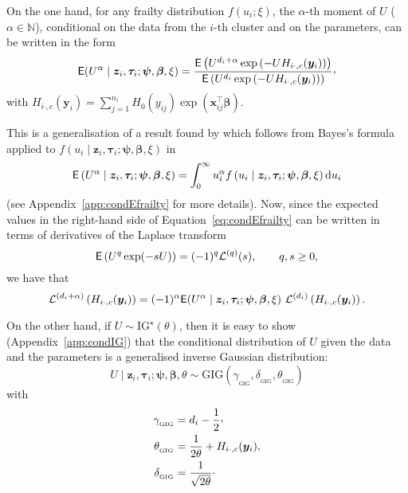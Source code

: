On the one hand, for any frailty distribution $f ( u_{i} ; \xi )$, 
  the $\alpha$-th moment of $U$ ($\alpha \in \mathbb N$),
  conditional on the data from the $i$-th cluster and on the parameters,
  can be written in the form 
\begin{equation} \label{eq:condEfrailty}
  \E(U^{\alpha} \mid \bm z_i, \bm \tau_i; \bm\psi, \bm\beta, \xi) = \frac{
    \E \left( U^{d_i + \alpha} \exp\left( 
      -U H_{i\cdot,c}(\bm y_i)
      \right)\right)
  }{
    \E \left( U^{d_i} \exp\left(
      -U H_{i\cdot,c}(\bm y_i)
    \right) \right)}
  \ccom
\end{equation}
with
$H_{i\cdot,c}(\bm y_i) = \sum_{j=1}^{n_i} H_0 ( y_{ij} ) \exp ( \bm x^\top_{ij} \bm\beta )$.

This is a generalisation of a result found by \cite{WangEtal95} which follows from Bayes's formula applied to $f ( u_{i} \mid \bm{z}_{i}, \bm{\tau}_i ; \bm{\psi}, \bm{\beta}, \xi )$ in
\[
 \mathsf{E} \left( U^\alpha \mid \bm z_i, \bm \tau_i ; \bm\psi, \bm\beta, \xi \right) 
  = \int_0^\infty u_i^\alpha f \left( u_i \mid \bm z_i, \bm \tau_i ; \bm\psi, \bm\beta, \xi \right) \mathrm d u_i 
\]
(see Appendix~\ref{app:condEfrailty} for more details).
%   
Now, since the expected values in the right-hand side of Equation~\ref{eq:condEfrailty}
  can be written in terms of derivatives of the Laplace transform
\[
  \mathsf{E} \left( U^q \exp(-sU) \right) = (-1)^q \mathcal L^{(q)}(s), \qquad q, s \geq 0,
\]
we have that
\begin{equation} \label{eq:dLTrecurs}
  \mathcal{L}^{( d_{i} + \alpha )} \left( 
    H_{i\cdot,c}(\bm y_i)
    \right) =
    ( - 1 )^{\alpha} \mathsf{E} ( U^{\alpha} \mid \bm{z}_{i}, \bm{\tau}_i; \bm{\psi}, \bm{\beta}, \xi ) 
    \ \mathcal{L}^{( d_{i} )} \left( 
    H_{i\cdot,c}(\bm y_i)
    \right).
\end{equation}

On the other hand, if $U \sim \textrm{IG}^\star (\theta)$, 
  then it is easy to show (Appendix~\ref{app:condIG})
  that the conditional distribution of $U$ given the data and the parameters is a 
  generalised inverse Gaussian distribution:
  \[
   U \mid \bm{z}_{i}, \bm \tau_i; \bm{\psi}, \bm{\beta}, \theta
    \sim \mathrm{GIG} (\gamma_{_{\mathrm{GIG}}}, \delta_{_{\mathrm{GIG}}}, \theta_{_{\mathrm{GIG}}} )
  \]
  with
  \begin{align} \label{eq:GIGpar1}
    \gamma_{_{\textrm{GIG}}} &= d_i - \frac12\ccom \\
    \theta_{_{\textrm{GIG}}} &= \frac1{2 \theta} + H_{i\cdot,c}(\bm y_i), \\
    \delta_{_{\textrm{GIG}}} &= \frac1{\sqrt{2 \theta}}\cdot
    \label{eq:GIGpar3}
  \end{align}

